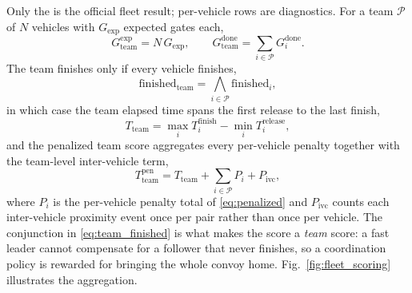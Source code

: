 Only the  is the official fleet result; per-vehicle rows are
diagnostics. For a team $\mathcal{P}$ of $N$ vehicles with $G_{\mathrm{exp}}$
expected gates each,
\begin{equation}
\label{eq:team_gates}
G_{\mathrm{team}}^{\mathrm{exp}}=N\,G_{\mathrm{exp}},\qquad
G_{\mathrm{team}}^{\mathrm{done}}=\sum_{i\in\mathcal{P}} G_i^{\mathrm{done}}.
\end{equation}
The team finishes only if every vehicle finishes,
\begin{equation}
\label{eq:team_finished}
\mathrm{finished}_{\mathrm{team}}=\bigwedge_{i\in\mathcal{P}}\mathrm{finished}_i,
\end{equation}
in which case the team elapsed time spans the first release to the last finish,
\begin{equation}
\label{eq:team_time}
T_{\mathrm{team}}=\max_{i} T_i^{\mathrm{finish}}-\min_{i} T_i^{\mathrm{release}},
\end{equation}
and the penalized team score aggregates every per-vehicle penalty together with
the team-level inter-vehicle term,
\begin{equation}
\label{eq:team_pen}
T_{\mathrm{team}}^{\mathrm{pen}}=T_{\mathrm{team}}+\sum_{i\in\mathcal{P}} P_i+P_{\mathrm{ivc}},
\end{equation}
where $P_i$ is the per-vehicle penalty total of \eqref{eq:penalized} and
$P_{\mathrm{ivc}}$ counts each inter-vehicle proximity event once per pair rather
than once per vehicle. The conjunction in \eqref{eq:team_finished} is what makes
the score a \emph{team} score: a fast leader cannot compensate for a follower
that never finishes, so a coordination policy is rewarded for bringing the whole
convoy home. Fig.~\ref{fig:fleet_scoring} illustrates the aggregation.


